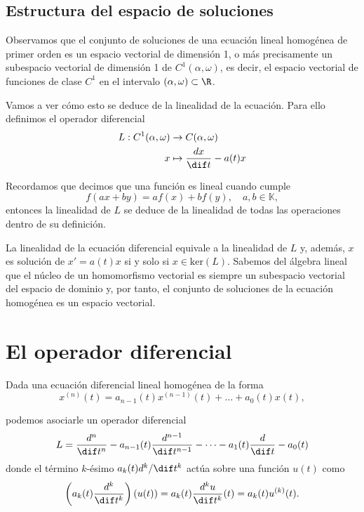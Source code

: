 \documentclass[../ecuaciones_diferenciales.tex]{subfiles}
\begin{document}
\subsection{Estructura del espacio de soluciones}

Observamos que el conjunto de soluciones de una ecuación lineal homogénea de
primer orden es un espacio vectorial de dimensión 1, o más precisamente un
subespacio vectorial de dimensión 1 de \(C^1(\alpha, \omega)\), es decir, el
espacio vectorial de funciones de clase \(C^1\) en el intervalo
\((\alpha, \omega) \subset \R\).

Vamos a ver cómo esto se deduce de la linealidad de la ecuación. Para ello
definimos el operador diferencial
\begin{align*}
	L : C^1(\alpha, \omega) & \to C(\alpha, \omega)              \\
	x                       & \mapsto \frac{d x}{\dif t} - a(t)x
\end{align*}

Recordamos que decimos que una función es lineal cuando cumple
\[f(ax + by) = af(x) + bf(y), \quad a, b \in \mathbb{K},\]
entonces la linealidad de \(L\) se deduce de la linealidad de todas las
operaciones dentro de su definición.

\begin{remark}
	La linealidad de la ecuación diferencial equivale a la linealidad de
	\(L\) y, además, \(x\) es solución de \(x' = a(t)x\) si y solo si
	\(x \in \text{ker}(L)\). Sabemos del álgebra lineal que el núcleo de un
	homomorfismo vectorial es siempre un subespacio vectorial del espacio de dominio
	y, por tanto, el conjunto de soluciones de la ecuación homogénea es un espacio
	vectorial.
\end{remark}

\section{El operador diferencial}

Dada una ecuación diferencial lineal homogénea de la forma
\[x^{(n)}(t) = a_{n-1}(t)x^{(n - 1)}(t) + \dots + a_0(t)x(t),\]

podemos asociarle un operador diferencial
\[L = \frac{d^n}{\dif t^n} - a_{n-1}(t)\frac{d^{n-1}}{\dif t^{n-1}}
	- \dots - a_1(t)\frac{d}{\dif t} - a_0(t)\]
donde el término \(k\)-ésimo \(a_k(t) d^k/\dif t^k\) actúa sobre una
función \(u(t)\) como
\[\left(a_k(t)\frac{d^k}{\dif t^k}\right)(u(t)) = a_k(t) \frac{d^ku}{\dif t^k}(t)
	= a_k(t) u^{(k)}(t).\]
\end{document}
